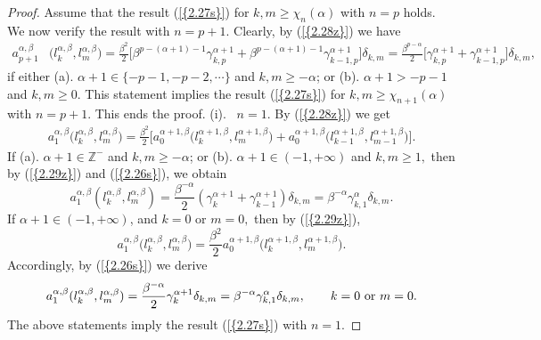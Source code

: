 \documentclass[10pt,reqno]{amsart}
\theoremstyle{remark}
\theoremstyle{definition}
\begin{document}
\begin{proof}
Assume that the result {{\rm (\ref{{2.27s}})}} for $k,m\ge \chi_{n}(\alpha)$ with $n=p$ holds. We now verify the result with $n=p+1.$ Clearly, by {{\rm (\ref{{2.28z}})}} we have
    \begin{align*}a^{\alpha,\beta}_{p+1}&\big(l^{{\alpha},{\beta}}_k,l^{{\alpha},{\beta}}_m\big)= \frac{\beta^2}{2} \big[  \beta^{p-(\alpha+1)-1}
    \gamma^{\alpha+1}_{k,p}  + \beta^{p-(\alpha+1)-1}
    \gamma^{\alpha+1}_{k-1,p}   \big]\delta_{k,m}
   =    \frac{\beta^{p-\alpha}}{2} \big[
    \gamma^{\alpha+1}_{k,p}  +
    \gamma^{\alpha+1}_{k-1,p}   \big]\delta_{k,m},\end{align*}
    if   either (a). $\alpha+1 \in \{ -p-1,-p-2,\cdots  \} $ and  $k,m\ge  -\alpha  $;  or (b). $\alpha+1>-p-1 $ and   $k,m\ge 0$.
    This statement implies the result {{\rm (\ref{{2.27s}})}} for $k,m\ge \chi_{n+1}(\alpha)$ with $n=p+1.$ This ends the proof.
\iffalse
(i).~ $n=1.$ By {{\rm (\ref{{2.28z}})}} we get
    \begin{align}\label{2.29z}a^{\alpha,\beta}_{1}\big(l^{{\alpha},{\beta}}_k,l^{{\alpha},{\beta}}_m\big)= \frac{\beta^2}{2} \big[ a^{\alpha+1,\beta}_{0}\big(l^{\alpha+1,{\beta}}_k,l^{\alpha+1,{\beta}}_m\big) + a^{\alpha+1,\beta}_{0}\big(l^{\alpha+1,{\beta}}_{k-1},l^{\alpha+1,{\beta}}_{m-1}\big)  \big].\end{align}
If (a). $\alpha+1\in \mathbb{Z}^-$ and $k,m\geq -\alpha$; or (b). $\alpha+1\in (-1,+\infty)$ and $k,m\geq 1,$ then by {{\rm (\ref{{2.29z}})}} and {{\rm (\ref{{2.26s}})}}, we obtain
$$a^{\alpha,\beta}_1(l^{{\alpha},{\beta}}_k,l^{{\alpha},{\beta}}_m)=\frac{\beta^{-\alpha}}{2} (\gamma^{\alpha+1}_{k}+\gamma^{\alpha+1}_{k-1})\delta_{k,m} =\beta^{-\alpha} \gamma^{\alpha}_{k,1}\delta_{k,m}.$$
If $\alpha+1\in (-1,+\infty)$, and $k=0$ or $m=0,$ then by {{\rm (\ref{{2.29z}})}},
$$a^{\alpha,\beta}_{1}\big(l^{{\alpha},{\beta}}_k,l^{{\alpha},{\beta}}_m\big)= \frac{\beta^2}{2} a^{\alpha+1,\beta}_{0}\big(l^{\alpha+1,{\beta}}_k,l^{\alpha+1,{\beta}}_m\big).$$
Accordingly, by {{\rm (\ref{{2.26s}})}} we derive
$$a^{\alpha,\beta}_1(l^{{\alpha},{\beta}}_k,l^{{\alpha},{\beta}}_m)
=\frac{\beta^{-\alpha}}{2} \gamma^{\alpha+1}_{k}\delta_{k,m} =\beta^{-\alpha} \gamma^{\alpha}_{k,1}\delta_{k,m},\qquad k=0 ~{\rm or}~ m=0.$$
The above statements imply the result {{\rm (\ref{{2.27s}})}} with $n=1.$


\end{proof}
\end{document}

